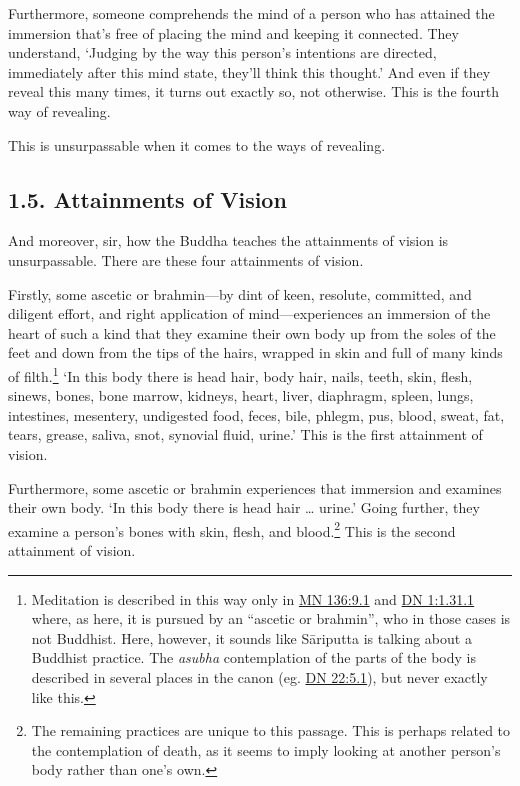 \documentclass[12pt,openany]{book}%
\begin{document}
Furthermore, someone comprehends the mind of a person who has attained the immersion that’s free of placing the mind and keeping it connected. They understand, ‘Judging by the way this person’s intentions are directed, immediately after this mind state, they’ll think this thought.’ And even if they reveal this many times, it turns out exactly so, not otherwise. This is the fourth way of revealing. 

This is unsurpassable when it comes to the ways of revealing. 

\subsection*{1.5. Attainments of Vision }

And moreover, sir, how the Buddha teaches the attainments of vision is unsurpassable. There are these four attainments of vision. 

Firstly, some ascetic or brahmin—by dint of keen, resolute, committed, and diligent effort, and right application of mind—experiences an immersion of the heart of such a kind that they examine their own body up from the soles of the feet and down from the tips of the hairs, wrapped in skin and full of many kinds of filth.\footnote{Meditation is described in this way only in \href{https://suttacentral.net/mn136/en/sujato\#9.1}{MN 136:9.1} and \href{https://suttacentral.net/dn1/en/sujato\#1.31.1}{DN 1:1.31.1} where, as here, it is pursued by an “ascetic or brahmin”, who in those cases is not Buddhist. Here, however, it sounds like \textsanskrit{Sāriputta} is talking about a Buddhist practice. The \textit{asubha} contemplation of the parts of the body is described in several places in the canon (eg. \href{https://suttacentral.net/dn22/en/sujato\#5.1}{DN 22:5.1}), but never exactly like this. } ‘In this body there is head hair, body hair, nails, teeth, skin, flesh, sinews, bones, bone marrow, kidneys, heart, liver, diaphragm, spleen, lungs, intestines, mesentery, undigested food, feces, bile, phlegm, pus, blood, sweat, fat, tears, grease, saliva, snot, synovial fluid, urine.’ This is the first attainment of vision. 

Furthermore, some ascetic or brahmin experiences that immersion and examines their own body. ‘In this body there is head hair … urine.’ Going further, they examine a person’s bones with skin, flesh, and blood.\footnote{The remaining practices are unique to this passage. This is perhaps related to the contemplation of death, as it seems to imply looking at another person’s body rather than one’s own. } This is the second attainment of vision. 
\end{document}
